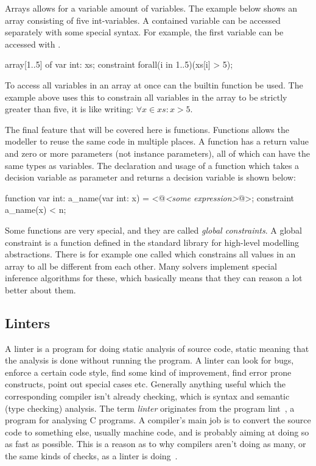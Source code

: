 \documentclass[a4paper,12pt]{article}
\newcommand{\mi}[1]{\mbox{\mzninline{#1}}}
\begin{document}
Arrays allows for a variable amount of variables. The example below shows an array \mi{xs}
consisting of five int-variables. A contained variable can be accessed separately with
some special syntax. For example, the first variable can be accessed with
\mi{xs[1]}.
\begin{mznnobreak}
array[1..5] of var int: xs;
constraint forall(i in 1..5)(xs[i] > 5);
\end{mznnobreak}
To access all variables in an array at once can the builtin function \mi{forall} be used.
The example above uses this to constrain all variables in the array to be strictly greater
than five, it is like writing: $\forall x \in xs : x > 5$.

The final feature that will be covered here is functions. Functions allows the modeller to
reuse the same code in multiple places. A function has a return value and zero or more
parameters (not instance parameters), all of which can have the same types as
variables. The declaration and usage of a function which takes a decision variable as
parameter and returns a decision variable is shown below:
\begin{mznnobreak}
function var int: a_name(var int: x) = <@\textit{<some expression>}@>;
constraint a_name(x) < n;
\end{mznnobreak}

Some functions are very special, and they are called \emph{global constraints}. A global
constraint is a function defined in the standard library for high-level modelling
abstractions. There is for example one called \mi{all_different} which constrains all
values in an array to all be different from each other. Many solvers implement
special inference algorithms for these, which basically means that they can reason a lot
better about them.

\subsection{Linters}\label{sec:bkg:linter}

A linter is a program for doing static analysis of source code, static meaning that the
analysis is done without running the program. A linter can look for bugs, enforce a
certain code style, find some kind of improvement, find error prone constructs, point out
special cases etc. Generally anything useful which the corresponding compiler isn't
already checking, which is syntax and semantic (type checking) analysis.
The term \emph{linter} originates from the program lint~\cite{lint}, a program for
analysing C programs. A compiler's main job is to convert the source code to something
else, usually machine code, and is probably aiming at doing so as fast as possible. This
is a reason as to why compilers aren't doing as many, or the same kinds of checks, as a
linter is doing~\cite{lint}.
\end{document}
